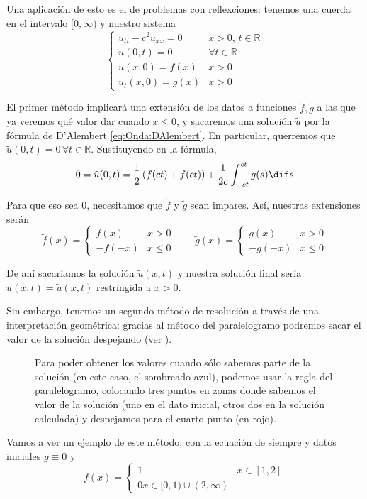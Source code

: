 		Una aplicación de esto es el de problemas con reflexciones: tenemos una cuerda en el intervalo $[0, ∞)$ y nuestro sistema \[ \begin{cases}
		u_{tt} - c^2u_{xx} = 0 & x > 0,\, t ∈ ℝ \\
		u(0,t) = 0 & ∀ t ∈ ℝ \\
		u(x,0) = f(x) & x > 0 \\
		u_t(x,0) = g(x) & x > 0
		\end{cases}\]

		El primer método implicará una extensión de los datos a funciones $\tilde{f}, \tilde{g}$ a las que ya veremos qué valor dar cuando $x ≤ 0$, y sacaremos una solución $\tilde{u}$ por la fórmula de D'Alembert \eqref{eq:Onda:DAlembert}. En particular, querremos que $\tilde{u}(0,t) = 0\,∀t ∈ ℝ$. Sustituyendo en la fórmula, \[ 0 = \tilde{u}(0,t) = \frac{1}{2} \left(f(ct) + f(ct)\right) + \frac{1}{2c} \int_{-ct}^{ct} g(s) \dif s \]

		Para que eso sea 0, necesitamos que $\tilde{f}$ y $\tilde{g}$ sean impares. Así, nuestras extensiones serán \[
		\tilde{f}(x) = \begin{cases}
		f(x) & x > 0 \\
		-f(-x) & x ≤ 0
		\end{cases} \qquad
		\tilde{g}(x) = \begin{cases}
		g(x) & x > 0 \\
		-g(-x) & x ≤ 0
		\end{cases}
		\]

		De ahí sacaríamos la solución $\tilde{u}(x,t)$ y nuestra solución final sería $u(x,t) = \tilde{u}(x,t)$ restringida a $x > 0$.

		Sin embargo, tenemos un segundo método de resolución a través de una interpretación geométrica: gracias al método del paralelogramo podremos sacar el valor de la solución despejando (ver ).

		\begin{figure}[hbtp]
		\caption{Para poder obtener los valores cuando sólo sabemos parte de la solución (en este caso, el sombreado azul), podemos usar la regla del paralelogramo, colocando tres puntos en zonas donde sabemos el valor de la solución (uno en el dato inicial, otros dos en la solución calculada) y despejamos para el cuarto punto (en rojo).}
		\label{fig:AplicacionParalelogramo}
		\end{figure}

		Vamos a ver un ejemplo de este método, con la ecuación de siempre y datos iniciales $g \equiv 0$ y \[ f(x) = \begin{cases} 1 & x ∈ [1,2] \\ 0 x ∈ [0,1) ∪ (2,∞) \end{cases} \]

